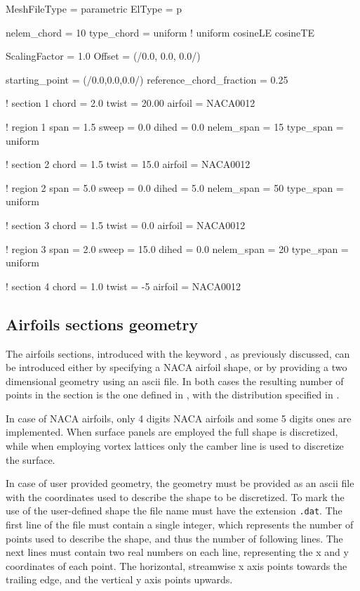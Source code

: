 \begin{inputfile}[frame=single, caption={Parametric geometry for figure \ref{fig:parametric_sections}}, label={file:parametric_example_file.in}]
MeshFileType = parametric
ElType = p

nelem_chord = 10
type_chord = uniform   ! uniform  cosineLE  cosineTE

ScalingFactor = 1.0
Offset = (/0.0, 0.0, 0.0/)

starting_point = (/0.0,0.0,0.0/)
reference_chord_fraction = 0.25

! section 1
chord = 2.0
twist = 20.00
airfoil = NACA0012

! region  1
span = 1.5
sweep = 0.0
dihed = 0.0
nelem_span = 15
type_span = uniform

! section 2
chord = 1.5
twist = 15.0
airfoil = NACA0012

! region  2
span = 5.0
sweep = 0.0
dihed = 5.0
nelem_span = 50
type_span = uniform

! section 3
chord = 1.5
twist = 0.0
airfoil = NACA0012

! region  3
span = 2.0
sweep = 15.0
dihed = 0.0
nelem_span = 20
type_span = uniform

! section 4
chord = 1.0
twist = -5
airfoil = NACA0012
\end{inputfile}


\subsection{Airfoils sections geometry}
The airfoils sections, introduced with the keyword , as previously discussed, can be introduced either by specifying a NACA airfoil shape, or by providing a two dimensional geometry using an ascii file. In both cases the resulting number of points in the section is the one defined in , with the distribution specified in . 

In case of NACA airfoils, only 4 digits NACA airfoils and some 5 digits ones are implemented. When surface panels are employed the full shape is discretized, while when employing vortex lattices only the camber line is used to discretize the surface. 

In case of user provided geometry, the geometry must be provided as an ascii file with the coordinates used to describe the shape to be discretized. To mark the use of the user-defined shape the file name must have the extension \texttt{.dat}. 
The first line of the file must contain a single integer, which represents the number of points used to describe the shape, and thus the number of following lines. 
The next lines must contain two real numbers on each line, representing the x and y coordinates of each point. The horizontal, streamwise x axis points  towards the trailing edge, and the vertical y axis points upwards. 

